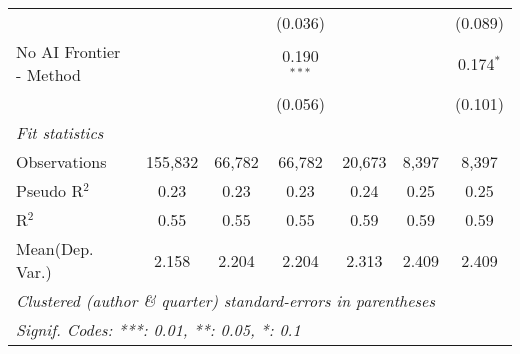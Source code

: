 \begin{tabular}{lcccccc}
                           &               &               & (0.036)       &               &               & (0.089)\\   
   No AI Frontier - Method &               &               & 0.190$^{***}$ &               &               & 0.174$^{*}$\\   
                           &               &               & (0.056)       &               &               & (0.101)\\   
   \midrule
   \emph{Fit statistics}\\
   Observations            & 155,832       & 66,782        & 66,782        & 20,673        & 8,397         & 8,397\\  
   Pseudo R$^2$            & 0.23          & 0.23          & 0.23          & 0.24          & 0.25          & 0.25\\  
   R$^2$                   & 0.55          & 0.55          & 0.55          & 0.59          & 0.59          & 0.59\\  
Mean(Dep. Var.) & 2.158 & 2.204 & 2.204 & 2.313 & 2.409 & 2.409 \\
   \midrule \midrule
   \multicolumn{7}{l}{\emph{Clustered (author \& quarter) standard-errors in parentheses}}\\
   \multicolumn{7}{l}{\emph{Signif. Codes: ***: 0.01, **: 0.05, *: 0.1}}\\
\end{tabular}
\par\endgroup
